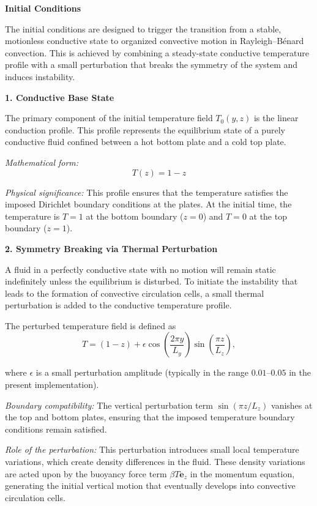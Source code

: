 \textbf{Initial Conditions}

The initial conditions are designed to trigger the transition from a stable, motionless conductive state to organized convective motion in Rayleigh--Bénard convection. This is achieved by combining a steady-state conductive temperature profile with a small perturbation that breaks the symmetry of the system and induces instability.

\textbf{1. Conductive Base State}

The primary component of the initial temperature field $T_0(y,z)$ is the linear conduction profile. This profile represents the equilibrium state of a purely conductive fluid confined between a hot bottom plate and a cold top plate.

\textit{Mathematical form:}
\begin{equation}
T(z) = 1 - z
\end{equation}

\textit{Physical significance:}  
This profile ensures that the temperature satisfies the imposed Dirichlet boundary conditions at the plates. At the initial time, the temperature is $T=1$ at the bottom boundary ($z=0$) and $T=0$ at the top boundary ($z=1$).

\textbf{2. Symmetry Breaking via Thermal Perturbation}

A fluid in a perfectly conductive state with no motion will remain static indefinitely unless the equilibrium is disturbed. To initiate the instability that leads to the formation of convective circulation cells, a small thermal perturbation is added to the conductive temperature profile.

The perturbed temperature field is defined as
\begin{equation}
T = (1 - z) + \epsilon \cos\left(\frac{2\pi y}{L_y}\right)\sin\left(\frac{\pi z}{L_z}\right),
\end{equation}

where $\epsilon$ is a small perturbation amplitude (typically in the range $0.01$--$0.05$ in the present implementation).

\textit{Boundary compatibility:}  
The vertical perturbation term $\sin(\pi z / L_z)$ vanishes at the top and bottom plates, ensuring that the imposed temperature boundary conditions remain satisfied.

\textit{Role of the perturbation:}  
This perturbation introduces small local temperature variations, which create density differences in the fluid. These density variations are acted upon by the buoyancy force term $\beta T \mathbf{e}_z$ in the momentum equation, generating the initial vertical motion that eventually develops into convective circulation cells.


